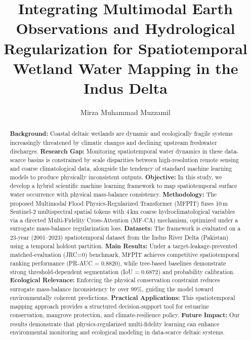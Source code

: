 \documentclass[preprint,12pt]{elsarticle}
\begin{document}
\begin{frontmatter}

\title{Integrating Multimodal Earth Observations and Hydrological Regularization for Spatiotemporal Wetland Water Mapping in the Indus Delta}

\author{Mirza Muhammad Muzzamil}




\begin{abstract}
\textbf{Background:} Coastal deltaic wetlands are dynamic and ecologically fragile systems increasingly threatened by climatic changes and declining upstream freshwater discharges. 
\textbf{Research Gap:} Monitoring spatiotemporal water dynamics in these data-scarce basins is constrained by scale disparities between high-resolution remote sensing and coarse climatological data, alongside the tendency of standard machine learning models to produce physically inconsistent outputs. 
\textbf{Objective:} In this study, we develop a hybrid scientific machine learning framework to map spatiotemporal surface water occurrence with physical mass-balance consistency. 
\textbf{Methodology:} The proposed Multimodal Flood Physics-Regularized Transformer (MFPIT) fuses 10\,m Sentinel-2 multispectral spatial tokens with 4\,km coarse hydroclimatological variables via a directed Multi-Fidelity Cross-Attention (MF-CA) mechanism, optimized under a surrogate mass-balance regularization loss. 
\textbf{Datasets:} The framework is evaluated on a 23-year (2001--2023) spatiotemporal dataset from the Indus River Delta (Pakistan) using a temporal holdout partition. 
\textbf{Main Results:} Under a target-leakage-prevented matched-evaluation (JRC=0) benchmark, MFPIT achieves competitive spatiotemporal ranking performance (PR-AUC = 0.8820), while tree-based baselines demonstrate strong threshold-dependent segmentation (IoU = 0.6872) and probability calibration. 
\textbf{Ecological Relevance:} Enforcing the physical conservation constraint reduces surrogate mass-balance inconsistency by over 99\%, guiding the model toward environmentally coherent predictions. 
\textbf{Practical Applications:} This spatiotemporal mapping approach provides a structured decision-support tool for estuarine conservation, mangrove protection, and climate-resilience policy. 
\textbf{Future Impact:} Our results demonstrate that physics-regularized multi-fidelity learning can enhance environmental monitoring and ecological modeling in data-scarce deltaic systems.
\end{abstract}


\end{frontmatter}
\end{document}
